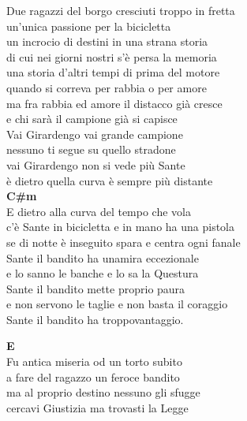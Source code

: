 \documentclass[10pt, twoside, a4paper]{article}
\begin{document}
\begin{multicols}{2}

Due ragazzi del borgo cresciuti troppo in fretta\\
un’unica passione per la bicicletta\\
un incrocio di destini in una strana storia\\
di cui nei giorni nostri s’\`e persa la memoria\\
una storia d’altri tempi di prima del motore\\
quando si correva per rabbia o per amore\\
ma fra rabbia ed amore il distacco gi\`a cresce\\
e chi sar\`a il campione gi\`a si capisce\\

Vai Girardengo vai grande campione\\
nessuno ti segue su quello stradone\\
vai Girardengo non si vede pi\`u Sante\\
\`e dietro quella curva \`e sempre pi\`u distante\\

\textbf{C\#m}\\
E dietro alla curva del tempo che vola\\
c’\`e Sante in bicicletta e in mano ha una pistola\\
se di notte \`e inseguito spara e centra ogni fanale\\
Sante il bandito ha unamira eccezionale\\
e lo sanno le banche e lo sa la Questura\\
Sante il bandito mette proprio paura\\
e non servono le taglie e non basta il coraggio\\
Sante il bandito ha troppovantaggio.\\
\columnbreak%

\textbf{E}\\
Fu antica miseria od un torto subito\\
a fare del ragazzo un feroce bandito\\
ma al proprio destino nessuno gli sfugge\\
cercavi Giustizia ma trovasti la Legge\\


\end{multicols}
\end{document}
